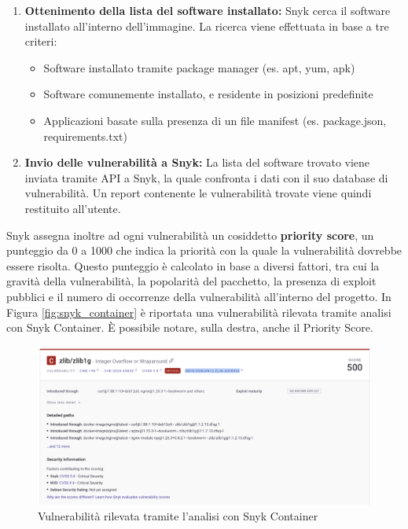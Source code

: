 \begin{itemize}
\begin{enumerate}
            \item \textbf{Ottenimento della lista del software installato:} Snyk cerca il software installato all'interno dell'immagine. La ricerca viene effettuata in base a tre criteri:
                  \begin{itemize}
                     \item Software installato tramite package manager (es. apt, yum, apk)
                     \item Software comunemente installato, e residente in posizioni predefinite
                     \item Applicazioni basate sulla presenza di un file manifest (es. package.json, requirements.txt)
                  \end{itemize}
            \item \textbf{Invio delle vulnerabilità a Snyk:} La lista del software trovato viene inviata tramite API a Snyk, la quale confronta i dati con il suo database di vulnerabilità. Un report contenente le vulnerabilità trovate viene quindi restituito all'utente.
         \end{enumerate}
         Snyk assegna inoltre ad ogni vulnerabilità un cosiddetto \textbf{priority score}, un punteggio da 0 a 1000 che indica la priorità con la quale la vulnerabilità dovrebbe essere risolta. Questo punteggio è calcolato in base a diversi fattori, tra cui la gravità della vulnerabilità, la popolarità del pacchetto, la presenza di exploit pubblici e il numero di occorrenze della vulnerabilità all'interno del progetto.
         In Figura \ref{fig:snyk_container} è riportata una vulnerabilità rilevata tramite analisi con Snyk Container. È possibile notare, sulla destra, anche il Priority Score.
         \begin{figure}[H]
            \centering
            \includegraphics[width=1\textwidth]{immagini/capitolo1/snyk_container.png}
            \caption{Vulnerabilità rilevata tramite l'analisi con Snyk Container}

\end{figure}
\end{itemize}
